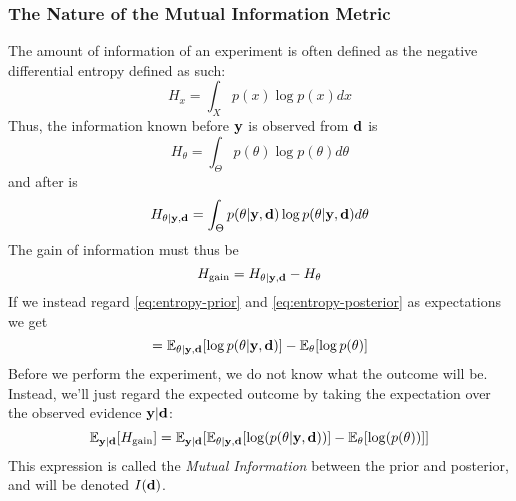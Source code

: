 \subsubsection{The Nature of the Mutual Information Metric}
The amount of information of an experiment is often defined as the negative differential entropy defined as such\cite{lindley56}:
\begin{equation}H_x = \int_{X}p(x)\log p(x)dx\end{equation}
Thus, the information known before $\mathbf{y}$ is observed from $\mathbf{d}$ is
\begin{equation}\label{eq:entropy-prior}H_\theta = \int_{\Theta}p(\theta)\log p(\theta)d\theta\end{equation}
and after is
\begin{equation}\label{eq:entropy-posterior}H_{\theta | \mathbf{y}, \mathbf{d}} = \int_{\Theta}p(\theta| \mathbf{y}, \mathbf{d})\log p(\theta| \mathbf{y}, \mathbf{d})d\theta\end{equation}
The gain of information must thus be
\begin{equation}H_\textrm{gain} = H_{\theta | \mathbf{y}, \mathbf{d}} - H_\theta\end{equation}
If we instead regard \eqref{eq:entropy-prior} and \eqref{eq:entropy-posterior} as expectations we get
\begin{equation} = \mathbb{E}_{\theta | \mathbf{y}, \mathbf{d}}[\log p(\theta | \mathbf{y}, \mathbf{d})] - \mathbb{E}_\theta [\log p(\theta )]\end{equation}
Before we perform the experiment, we do not know what the outcome will be. Instead, we'll just regard the expected outcome by taking the expectation over the observed evidence $\mathbf{y} | \mathbf{d}$:
\begin{equation} \label{eq:mi-bad}\mathbb{E}_{\mathbf{y} | \mathbf{d}}[H_\textrm{gain}]  = \mathbb{E}_{\mathbf{y} | \mathbf{d}}[\mathbb{E}_{\theta | \mathbf{y}, \mathbf{d}} [\log(p(\theta | \mathbf{y}, \mathbf{d}))] - \mathbb{E}_{\theta}[\log(p(\theta))]]\end{equation}
This expression is called the \textit{Mutual Information} between the prior and posterior, and will be denoted $I(\mathbf{d})$.\\
